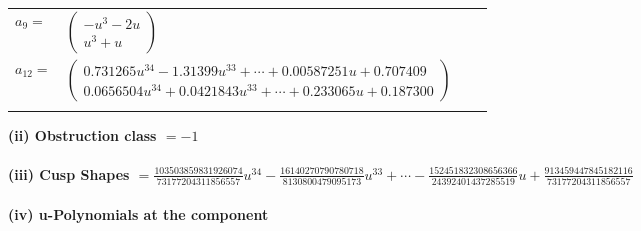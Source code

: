\documentclass[1p]{elsarticle_modified}
\theoremstyle{definition}
\begin{document}
\begin{tabular}{m{7pt} m{180pt} m{7pt} m{180pt} }
\flushright $a_{9}=$&$\begin{pmatrix}- u^3-2 u\\u^3+u\end{pmatrix}$ \\
\flushright $a_{12}=$&$\begin{pmatrix}0.731265 u^{34}-1.31399 u^{33}+\cdots+0.00587251 u+0.707409\\0.0656504 u^{34}+0.0421843 u^{33}+\cdots+0.233065 u+0.187300\end{pmatrix}$\\&\end{tabular}
\flushleft \textbf{(ii) Obstruction class $= -1$}\\~\\
\flushleft \textbf{(iii) Cusp Shapes $= \frac{103503859831926074}{73177204311856557} u^{34}-\frac{16140270790780718}{8130800479095173} u^{33}+\cdots-\frac{152451832308656366}{24392401437285519} u+\frac{913459447845182116}{73177204311856557}$}\\~\\
\newpage\renewcommand{\arraystretch}{1}
\flushleft \textbf{(iv) u-Polynomials at the component}\newline \\
\end{document}

